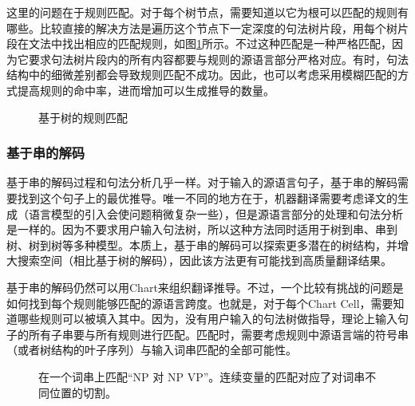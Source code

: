 \parinterval 这里的问题在于规则匹配。对于每个树节点，需要知道以它为根可以匹配的规则有哪些。比较直接的解决方法是遍历这个节点下一定深度的句法树片段，用每个树片段在文法中找出相应的匹配规则，如图\ref{fig:4-69}所示。不过这种匹配是一种严格匹配，因为它要求句法树片段内的所有内容都要与规则的源语言部分严格对应。有时，句法结构中的细微差别都会导致规则匹配不成功。因此，也可以考虑采用模糊匹配的方式提高规则的命中率，进而增加可以生成推导的数量\cite{zhu2011improving}。

\begin{figure}[htp]
\centering

\caption{基于树的规则匹配}
\label{fig:4-69}
\end{figure}


\subsubsection{基于串的解码}

\parinterval 基于串的解码过程和句法分析几乎一样。对于输入的源语言句子，基于串的解码需要找到这个句子上的最优推导。唯一不同的地方在于，机器翻译需要考虑译文的生成（语言模型的引入会使问题稍微复杂一些），但是源语言部分的处理和句法分析是一样的。因为不要求用户输入句法树，所以这种方法同时适用于树到串、串到树、树到树等多种模型。本质上，基于串的解码可以探索更多潜在的树结构，并增大搜索空间（相比基于树的解码），因此该方法更有可能找到高质量翻译结果。

\parinterval 基于串的解码仍然可以用Chart来组织翻译推导。不过，一个比较有挑战的问题是如何找到每个规则能够匹配的源语言跨度。也就是，对于每个Chart Cell，需要知道哪些规则可以被填入其中。因为，没有用户输入的句法树做指导，理论上输入句子的所有子串要与所有规则进行匹配。匹配时，需要考虑规则中源语言端的符号串（或者树结构的叶子序列）与输入词串匹配的全部可能性。

\begin{figure}[htp]
\centering

\caption{在一个词串上匹配``NP 对 NP VP''。连续变量的匹配对应了对词串不同位置的切割。}
\label{fig:4-70}
\end{figure}


